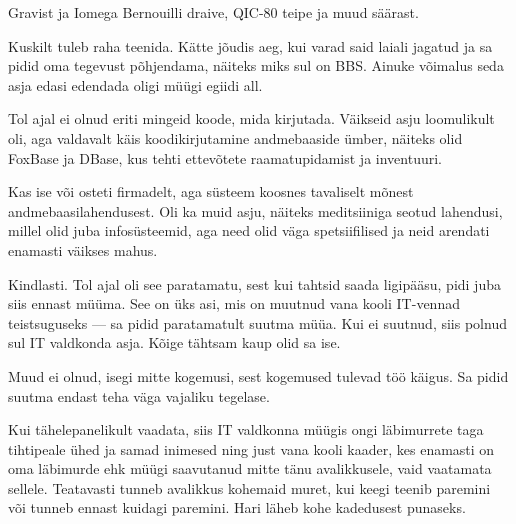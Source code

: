
Gravist ja Iomega Bernouilli draive, QIC-80 
teipe ja muud säärast.


Kuskilt tuleb raha teenida. Kätte jõudis aeg, kui varad said laiali 
jagatud ja sa pidid oma tegevust põhjendama, näiteks miks sul on 
BBS. Ainuke võimalus seda asja edasi edendada oligi müügi 
egiidi all.


Tol ajal ei olnud eriti mingeid koode, mida kirjutada. Väikseid asju loomulikult oli, aga valdavalt käis koodikirjutamine 
andmebaaside ümber, näiteks olid FoxBase ja DBase, kus tehti 
ettevõtete raamatupidamist ja inventuuri. 


Kas ise või osteti firmadelt, aga süsteem koosnes tavaliselt 
mõnest andmebaasilahendusest. Oli ka muid asju, 
näiteks meditsiiniga seotud lahendusi, millel olid juba infosüsteemid, aga 
need olid väga spetsiifilised ja neid arendati enamasti väikses mahus.


Kindlasti. Tol ajal oli see paratamatu, sest kui tahtsid 
saada ligipääsu, pidi juba siis ennast müüma. See on üks asi, mis on muutnud 
vana kooli IT-vennad teistsuguseks --- sa pidid paratamatult suutma müüa. Kui ei suutnud, siis polnud sul IT valdkonda asja. Kõige 
tähtsam kaup olid sa ise.


Muud ei olnud, isegi mitte kogemusi, sest kogemused tulevad töö käigus. Sa pidid suutma endast teha väga vajaliku tegelase.


Kui tähelepanelikult vaadata, siis IT valdkonna müügis ongi 
läbimurrete taga tihtipeale ühed ja samad inimesed ning just 
vana kooli kaader, kes enamasti on oma läbimurde ehk müügi saavutanud mitte 
tänu avalikkusele, vaid vaatamata sellele. Teatavasti tunneb avalikkus 
kohemaid muret, kui keegi teenib paremini või tunneb ennast kuidagi paremini. 
Hari läheb kohe kadedusest punaseks.

